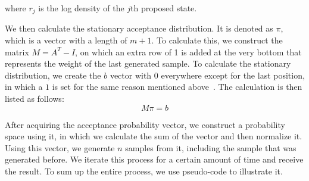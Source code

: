where $r_j$ is the log density of the $j$th proposed state.

We then calculate the stationary acceptance distribution. It is denoted as $\pi$, which is a vector with a length of $m+1$. To calculate this, we construct the matrix $M = A^T - I$, on which an extra row of 1 is added at the very bottom that represents the weight of the last generated sample. To calculate the stationary distribution, we create the $b$ vector with $0$ everywhere except for the last position, in which a $1$ is set for the same reason mentioned above~\cite{gpmh_derivation}. The calculation is then listed as follows:
\begin{equation}
M\pi = b
\end{equation}

After acquiring the acceptance probability vector, we construct a probability space using it, in which we calculate the sum of the vector and then normalize it. Using this vector, we generate $n$ samples from it, including the sample that was generated before. We iterate this process for a certain amount of time and receive the result. To sum up the entire process, we use pseudo-code to illustrate it.
\\


